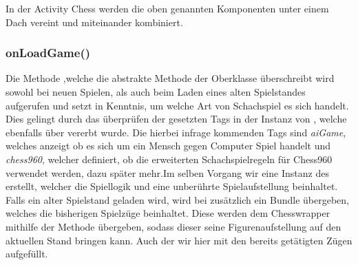 In der Activity Chess werden die oben genannten Komponenten unter einem Dach 
vereint und miteinander kombiniert.

\subsubsection{onLoadGame()}

Die Methode ,welche die abstrakte Methode der Oberklasse
 überschreibt wird sowohl bei neuen Spielen, als auch beim
Laden eines alten Spielstandes aufgerufen und setzt in Kenntnis, um welche Art
von Schachspiel es sich handelt. Dies gelingt durch das überprüfen der gesetzten
Tags in der Instanz von , welche ebenfalls über 
vererbt wurde. Die hierbei infrage kommenden Tags sind \emph{aiGame}, welches
anzeigt ob es sich um ein Mensch gegen Computer Spiel handelt und
\emph{chess960}, welcher definiert, ob die erweiterten Schachspielregeln für
Chess960 verwendet werden, dazu später mehr.\newline Im selben Vorgang wir eine
Instanz des  erstellt, welcher die Spiellogik und eine
unberührte Spielaufstellung beinhaltet. Falls ein alter Spielstand geladen wird,
wird bei  zusätzlich ein Bundle übergeben, welches die
bisherigen Spielzüge beinhaltet. Diese werden dem Chesswrapper mithilfe der
Methode  übergeben, sodass dieser seine Figurenaufstellung auf
den aktuellen Stand bringen kann. Auch der  wir hier
mit den bereits getätigten Zügen aufgefüllt.

